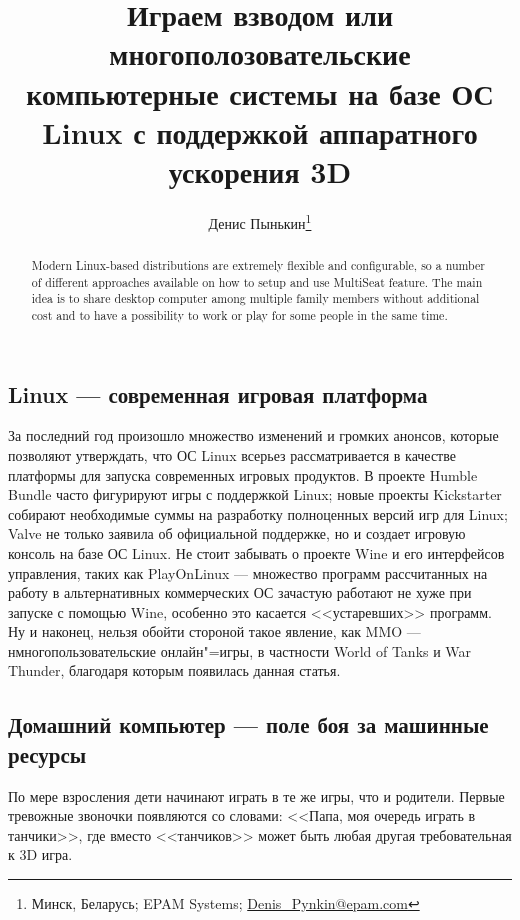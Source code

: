 \documentclass[10pt, a5paper]{article}
\begin{document}
\title{Играем взводом или многополозовательские компьютерные системы на базе ОС Linux с поддержкой аппаратного ускорения 3D}

\author{Денис Пынькин\footnote{Минск, Беларусь; EPAM Systems; \url{Denis_Pynkin@epam.com}}}
\maketitle

\begin{abstract}
	Modern Linux-based distributions are extremely flexible and configurable, so a number of different approaches available on how to setup and use MultiSeat feature. The main idea is to share desktop computer among multiple family members without additional cost and to have a possibility to work or play for some people in the same time.
\end{abstract}

\subsection*{Linux --- современная игровая платформа}

За последний год произошло множество изменений и громких анонсов, которые позволяют
утверждать, что ОС Linux всерьез рассматривается в качестве платформы для запуска 
современных игровых продуктов. 
В проекте Humble Bundle часто фигурируют игры с поддержкой Linux; новые проекты Kickstarter
собирают необходимые суммы на разработку полноценных версий игр для Linux; Valve не только заявила
об официальной поддержке, но и создает игровую консоль на базе ОС Linux.
Не стоит забывать о проекте Wine и его интерфейсов управления, таких как PlayOnLinux --- множество 
программ рассчитанных на работу в альтернативных коммерческих ОС зачастую работают не хуже 
при запуске с помощью Wine, особенно это касается <<устаревших>> программ.
Ну и наконец, нельзя обойти стороной такое явление, как MMO --- нмногопользовательские онлайн"=игры,
в частности World of Tanks и War Thunder, благодаря которым появилась данная статья. 

\subsection*{Домашний компьютер --- поле боя за машинные ресурсы}

По мере взросления дети начинают играть в те же игры, что и родители. 
Первые тревожные звоночки появляются со словами: <<Папа, моя очередь играть в танчики>>,
где вместо <<танчиков>> может быть любая другая требовательная к 3D игра.
\end{document}
